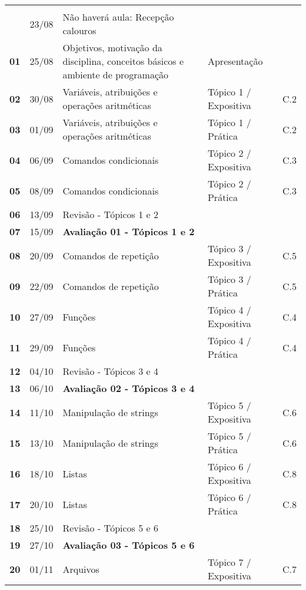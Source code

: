 \documentclass[a4paper, 11pt]{article}
\begin{document}
\begin{longtable}{>{\bfseries}ccp{7cm}lc}
\midrule
\endhead
\midrule\multicolumn{5}{r}{Continua na página seguinte} \\
\endfoot
\endlastfoot
\rowcolor{green!25} & 23/08 & Não haverá aula: Recepção calouros &  & \\
\rowcolor{yellow!25} 01 & 25/08 & Objetivos, motivação da disciplina, conceitos básicos e ambiente de programação & Apresentação & \\
\rowcolor{gray!25} 02 & 30/08 & Variáveis, atribuições e operações aritméticas & Tópico 1 / Expositiva & C.2\\
\rowcolor{yellow!25} 03 & 01/09 & Variáveis, atribuições e operações aritméticas & Tópico 1 / Prática & C.2\\
\rowcolor{gray!25} 04 & 06/09 & Comandos condicionais & Tópico 2 / Expositiva & C.3\\
\rowcolor{yellow!25} 05 & 08/09 & Comandos condicionais & Tópico 2 / Prática & C.3\\
\rowcolor{gray!25} 06 & 13/09 & Revisão - Tópicos 1 e 2 &  & \\
\rowcolor{red!15} 07 & 15/09 & \textbf{Avaliação 01 - Tópicos 1 e 2} &  & \\
\rowcolor{gray!25} 08 & 20/09 & Comandos de repetição & Tópico 3 / Expositiva & C.5\\
\rowcolor{yellow!25} 09 & 22/09 & Comandos de repetição & Tópico 3 / Prática & C.5\\
\rowcolor{gray!25} 10 & 27/09 & Funções & Tópico 4 / Expositiva & C.4\\
\rowcolor{yellow!25} 11 & 29/09 & Funções & Tópico 4 / Prática & C.4\\
\rowcolor{gray!25} 12 & 04/10 & Revisão - Tópicos 3 e 4 &  & \\
\rowcolor{red!15} 13 & 06/10 & \textbf{Avaliação 02 - Tópicos 3 e 4} &  & \\
\rowcolor{gray!25} 14 & 11/10 & Manipulação de strings & Tópico 5 / Expositiva & C.6\\
\rowcolor{yellow!25} 15 & 13/10 & Manipulação de strings & Tópico 5 / Prática & C.6\\
\rowcolor{gray!25} 16 & 18/10 & Listas & Tópico 6 / Expositiva & C.8\\
\rowcolor{yellow!25} 17 & 20/10 & Listas & Tópico 6 / Prática & C.8\\
\rowcolor{gray!25} 18 & 25/10 & Revisão - Tópicos 5 e 6 &  & \\
\rowcolor{red!15} 19 & 27/10 & \textbf{Avaliação 03 - Tópicos 5 e 6} &  & \\
\rowcolor{gray!25} 20 & 01/11 & Arquivos & Tópico 7 / Expositiva & C.7\\

\end{longtable}
\end{document}
